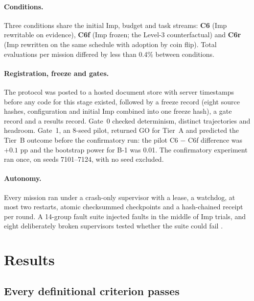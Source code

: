 \documentclass[11pt]{article}
\begin{document}
\paragraph{Conditions.} Three conditions share the initial Imp, budget and task streams: \textbf{C6} (Imp rewritable on evidence), \textbf{C6f} (Imp frozen; the Level-3 counterfactual) and \textbf{C6r} (Imp rewritten on the same schedule with adoption by coin flip). Total evaluations per mission differed by less than 0.4\% between conditions.

\paragraph{Registration, freeze and gates.} The protocol was posted to a hosted document store with server timestamps before any code for this stage existed, followed by a freeze record (eight source hashes, configuration and initial Imp combined into one freeze hash), a gate record and a results record. Gate~0 checked determinism, distinct trajectories and headroom. Gate~1, an 8-seed pilot, returned GO for Tier~A and predicted the Tier~B outcome before the confirmatory run: the pilot C6 $-$ C6f difference was $+0.1$ pp and the bootstrap power for B-1 was 0.01. The confirmatory experiment ran once, on seeds 7101--7124, with no seed excluded.

\paragraph{Autonomy.} Every mission ran under a crash-only supervisor \cite{candea2003} with a lease, a watchdog, at most two restarts, atomic checksummed checkpoints and a hash-chained receipt per round. A 14-group fault suite injected faults in the middle of Imp trials, and eight deliberately broken supervisors tested whether the suite could fail \cite{demillo1978,jia2011}.

\section{Results}\label{sec:results}

\subsection{Every definitional criterion passes}
\end{document}
